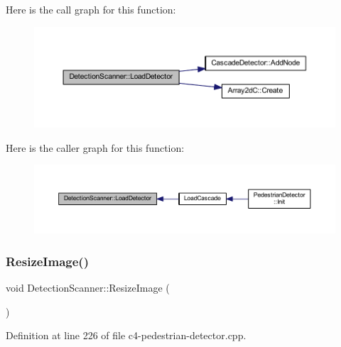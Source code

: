 Here is the call graph for this function\+:\nopagebreak
\begin{figure}[H]
\begin{center}
\leavevmode
\includegraphics[width=350pt]{class_detection_scanner_a36c4db431f28648b82bd6e55afb67008_cgraph}
\end{center}
\end{figure}
Here is the caller graph for this function\+:\nopagebreak
\begin{figure}[H]
\begin{center}
\leavevmode
\includegraphics[width=350pt]{class_detection_scanner_a36c4db431f28648b82bd6e55afb67008_icgraph}
\end{center}
\end{figure}
\mbox{\label{class_detection_scanner_a01790349ec7aef4ff03335d5e76f183a}} 
\subsubsection{\texorpdfstring{Resize\+Image()}{ResizeImage()}}
{\footnotesize\ttfamily void Detection\+Scanner\+::\+Resize\+Image (\begin{DoxyParamCaption}{ }\end{DoxyParamCaption})\hspace{0.3cm}{\ttfamily [private]}}



Definition at line 226 of file c4-\/pedestrian-\/detector.\+cpp.


